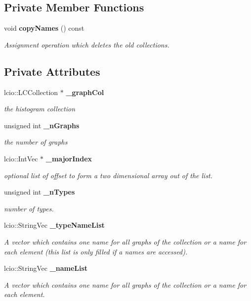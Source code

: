 \subsection*{Private Member Functions}
\begin{DoxyCompactItemize}
\item 
void {\bf copy\-Names} () const 
\begin{DoxyCompactList}\small\item\em Assignment operation which deletes the old collections. \end{DoxyCompactList}\end{DoxyCompactItemize}
\subsection*{Private Attributes}
\begin{DoxyCompactItemize}
\item 
lcio\-::\-L\-C\-Collection $\ast$ {\bf \-\_\-graph\-Col}\label{classhistmgr_1_1GraphCollection__t_a1196d28c374dfd4e4fdd291542b392f2}

\begin{DoxyCompactList}\small\item\em the histogram collection \end{DoxyCompactList}\item 
unsigned int {\bf \-\_\-n\-Graphs}\label{classhistmgr_1_1GraphCollection__t_ab839badb20a05434321be1bf9ff36831}

\begin{DoxyCompactList}\small\item\em the number of graphs \end{DoxyCompactList}\item 
lcio\-::\-Int\-Vec $\ast$ {\bf \-\_\-major\-Index}
\begin{DoxyCompactList}\small\item\em optional list of offset to form a two dimensional array out of the list. \end{DoxyCompactList}\item 
unsigned int {\bf \-\_\-n\-Types}
\begin{DoxyCompactList}\small\item\em number of types. \end{DoxyCompactList}\item 
lcio\-::\-String\-Vec {\bf \-\_\-type\-Name\-List}
\begin{DoxyCompactList}\small\item\em A vector which contains one name for all graphs of the collection or a name for each element (this list is only filled if a names are accessed). \end{DoxyCompactList}\item 
lcio\-::\-String\-Vec {\bf \-\_\-name\-List}
\begin{DoxyCompactList}\small\item\em A vector which contains one name for all graphs of the collection or a name for each element. \end{DoxyCompactList}\end{DoxyCompactItemize}
